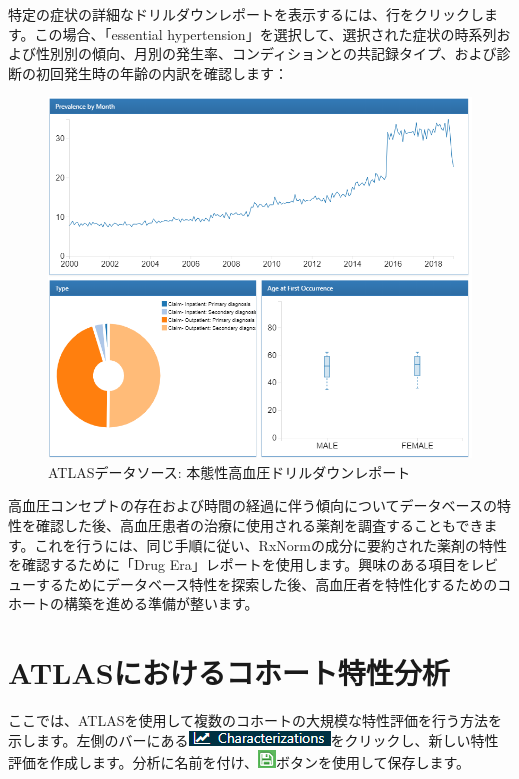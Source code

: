 \documentclass[
  11pt]{book}
\theoremstyle{definition}
\theoremstyle{definition}
\theoremstyle{definition}
\theoremstyle{definition}
\theoremstyle{remark}
\begin{document}
特定の症状の詳細なドリルダウンレポートを表示するには、行をクリックします。この場合、「essential hypertension」を選択して、選択された症状の時系列および性別別の傾向、月別の発生率、コンディションとの共記録タイプ、および診断の初回発生時の年齢の内訳を確認します：

\begin{figure}

{\centering \includegraphics[width=1\linewidth]{images/Characterization/atlasDataSourcesDrillDownReport} 

}

\caption{ATLASデータソース: 本態性高血圧ドリルダウンレポート}\label{fig:atlasDataSourcesDrillDownReport}
\end{figure}

高血圧コンセプトの存在および時間の経過に伴う傾向についてデータベースの特性を確認した後、高血圧患者の治療に使用される薬剤を調査することもできます。これを行うには、同じ手順に従い、RxNormの成分に要約された薬剤の特性を確認するために「Drug Era」レポートを使用します。興味のある項目をレビューするためにデータベース特性を探索した後、高血圧者を特性化するためのコホートの構築を進める準備が整います。

\section{ATLASにおけるコホート特性分析}\label{atlasux306bux304aux3051ux308bux30b3ux30dbux30fcux30c8ux7279ux6027ux5206ux6790}

ここでは、ATLASを使用して複数のコホートの大規模な特性評価を行う方法を示します。左側のバーにある\includegraphics{images/Characterization/atlasCharacterizationMenuItem.png}をクリックし、新しい特性評価を作成します。分析に名前を付け、\includegraphics{images/PopulationLevelEstimation/save.png}ボタンを使用して保存します。
\end{document}
